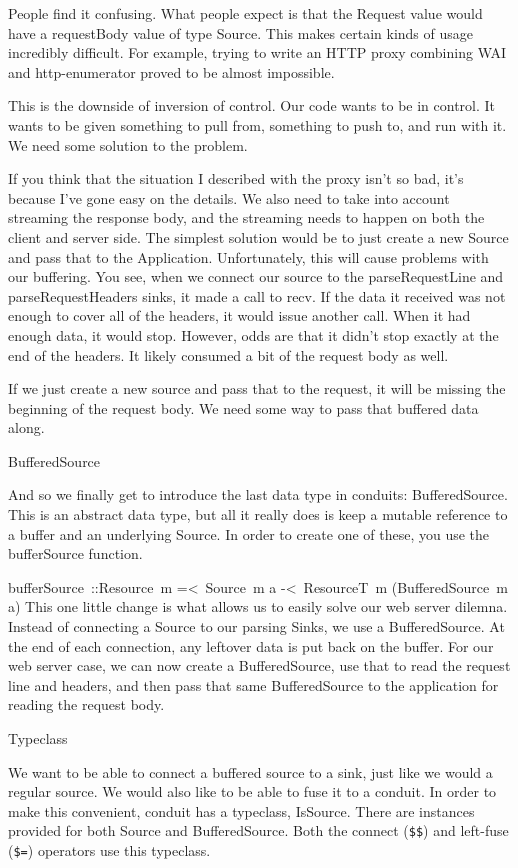 \begin{verbaim}
People find it confusing. What people expect is that the Request
value would have a requestBody value of type Source.
This makes certain kinds of usage incredibly difficult. For example, trying to write an
HTTP
proxy combining WAI and http-enumerator proved to be almost impossible.

This is the downside of inversion of control. Our code wants to be in control. It wants to
be
given something to pull from, something to push to, and run with it. We need some solution
to the
problem.

If you think that the situation I described with the proxy isn't so bad, it's because I've
gone easy on the details. We also need to take into account streaming the response body,
and the
streaming needs to happen on both the client and server side.
The simplest solution would be to just create a new Source and pass that to
the Application. Unfortunately, this will cause problems with our buffering. You
see, when we connect our source to the parseRequestLine and
parseRequestHeaders sinks, it made a call to recv. If the data
it received was not enough to cover all of the headers, it would issue another call. When
it had
enough data, it would stop. However, odds are that it didn't stop exactly at the end of
the headers. It likely consumed a bit of the request body as well.

If we just create a new source and pass that to the request, it will be missing the
beginning
of the request body. We need some way to pass that buffered data along.

BufferedSource

And so we finally get to introduce the last data type in conduits:
BufferedSource. This is an abstract data type, but all it really does is keep a
mutable reference to a buffer and an underlying Source. In order to create one
of these, you use the bufferSource function.

bufferSource ::Resource m =< Source m a -< ResourceT m (BufferedSource m a)
This one little change is what allows us to easily solve our web server dilemna. Instead
of
connecting a Source to our parsing Sinks, we use a
BufferedSource. At the end of each connection, any leftover data is put back on
the buffer. For our web server case, we can now create a BufferedSource, use
that to read the request line and headers, and then pass that same
BufferedSource to the application for reading the request body.

Typeclass

We want to be able to connect a buffered source to a sink, just like we would a regular
source.
We would also like to be able to fuse it to a conduit. In order to make this convenient,
conduit
has a typeclass, IsSource. There are instances provided for both
Source and BufferedSource. Both the connect
(\verb#$$#) and left-fuse (\verb#$=#) operators use this typeclass.


\end{verbaim}
